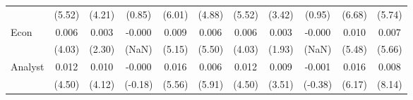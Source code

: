 \begin{table}[H]
{\begin{tabular}{lcccccccccc}
   & (5.52) & (4.21) & (0.85) & (6.01) & (4.88) & (5.52) & (3.42) & (0.95) & (6.68) & (5.74) \\ 
  Econ & 0.006 & 0.003 & -0.000 & 0.009 & 0.006 & 0.006 & 0.003 & -0.000 & 0.010 & 0.007 \\ 
   & (4.03) & (2.30) & (NaN) & (5.15) & (5.50) & (4.03) & (1.93) & (NaN) & (5.48) & (5.66) \\ 
  Analyst & 0.012 & 0.010 & -0.000 & 0.016 & 0.006 & 0.012 & 0.009 & -0.001 & 0.016 & 0.008 \\ 
   & (4.50) & (4.12) & (-0.18) & (5.56) & (5.91) & (4.50) & (3.51) & (-0.38) & (6.17) & (8.14) \\ 
   \hline 
\end{tabular}
}
\end{table}
